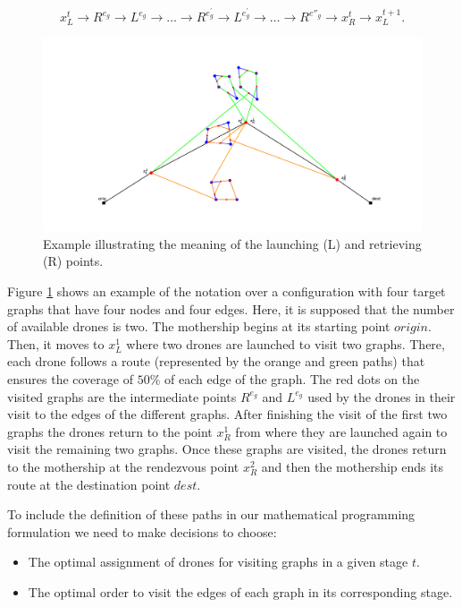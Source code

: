 $$
x_L^t\rightarrow R^{e_g}\rightarrow L^{e_g}\rightarrow\ldots\rightarrow R^{e^\prime_g}\rightarrow L^{e^\prime_g}\rightarrow \ldots \rightarrow R^{e''_g} \rightarrow x_R^t\rightarrow x_L^{t+1}.
$$


\begin{figure}[h!]
\centering
\includegraphics[width=0.95\linewidth]{figures/figure_latex.png}
\caption{Example illustrating the meaning of the launching  (L) and retrieving (R) points.}
\label{fig:illustrative}
\end{figure}

\noindent
Figure \ref{fig:illustrative} shows an example of the notation over a configuration with four target graphs that have four nodes and four edges. Here, it is supposed that the number of available drones is two. %
The mothership begins at its starting point $origin$. Then, it moves to $x_L^1$ where two drones are launched to visit two graphs. There, each drone follows a route (represented by the orange and green paths) that ensures the coverage of $50 \%$ of each edge of the graph. The red dots on the visited graphs are the intermediate points $R^{e_g}$ and $L^{e_g}$ used by the drones in their visit to the edges of the different graphs. After finishing the visit of the first two graphs the drones return to the point $x_R^1$ from where they are launched again to visit the remaining two graphs. Once these graphs are visited, the drones return to the mothership at the rendezvous point $x_R^2$ and then the mothership ends its route at the destination point $dest$.




\noindent
To include the definition of these paths in our mathematical programming formulation we need to make decisions to choose:
\begin{itemize}
    \item The optimal assignment of drones for visiting graphs in a given stage $t$.
    \item The optimal order to visit the edges of each graph in its corresponding stage.
\end{itemize}

